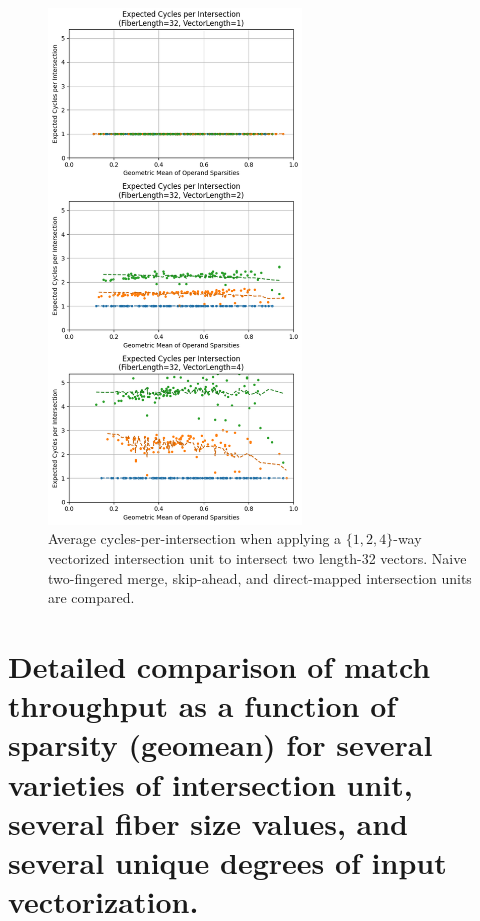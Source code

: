 \begin{figure}[H]
\centering
\includegraphics[width=0.6\textwidth]{figures/expected_cycles_F32.png}
\caption{Average cycles-per-intersection when applying a $\{1,2,4\}$-way vectorized intersection unit to intersect two length-32 vectors. Naive two-fingered merge, skip-ahead, and direct-mapped intersection units are compared.}
\label{fig:expected_cycles_F32}
\end{figure}

\clearpage

\section{Detailed comparison of match throughput as a function of sparsity (geomean) for several varieties of intersection unit, several fiber size values, and several unique degrees of input vectorization.}

\clearpage

